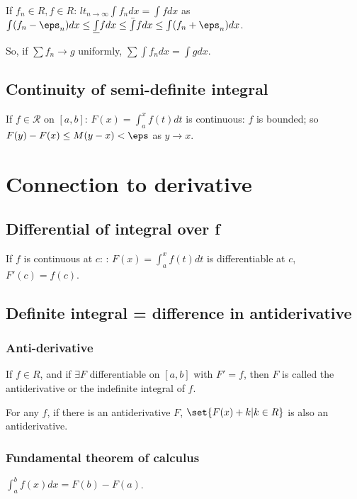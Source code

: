 \documentclass[oneside, article]{memoir}
\begin{document}
If $f_{n} \in R, f \in R$: $lt_{n \to \infty} \int f_{n} dx = \int f dx$ as $\int (f_{n} - \eps_{n}) dx \leq \underline{\int} f dx \leq \bar{\int} f dx \leq \int (f_{n} + \eps_{n})dx$.

So, if $\sum f_{n} \to g$ uniformly, $\sum \int f_{n} dx = \int g dx$.

\subsection{Continuity of semi-definite integral}
If $f \in \mathcal{R}$ on $[a, b]$: $F(x) = \int_{a}^{x}f(t)dt$ is continuous: $f$ is bounded; so $F(y) - F(x) \leq M (y-x) < \eps$ as $y \to x$.

\section{Connection to derivative}
\subsection{Differential of integral over f}
If $f$ is continuous at $c$: : $F(x) = \int_{a}^{x}f(t)dt$ is differentiable at $c$, $F'(c) = f(c)$.


\subsection{Definite integral = difference in antiderivative}
\subsubsection{Anti-derivative}
If $f \in R$, and if $\exists F$ differentiable on $[a, b]$ with $F' = f$, then $F$ is called the antiderivative or the indefinite integral of $f$.

For any $f$, if there is an antiderivative $F$, $\set{F(x) + k | k \in R}$ is also an antiderivative. 

\subsubsection{Fundamental theorem of calculus}
$\int_{a}^{b} f(x)dx = F(b) - F(a)$.
\end{document}
